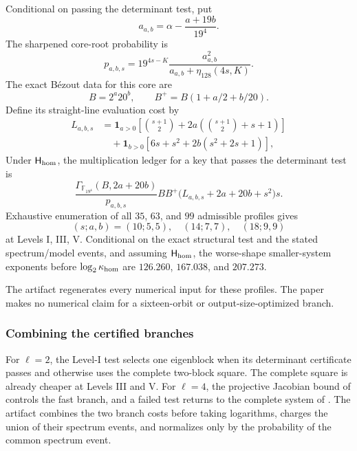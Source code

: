 \documentclass[11pt]{article}
\newcommand{\F}{\mathbb F}
\begin{document}
Conditional on passing the determinant test, put
\[
 a_{a,b}=\alpha-\frac{a+19b}{19^4}.
\]
The sharpened core-root probability is
\begin{equation}
 p_{a,b,s}
 =19^{4s-K}\frac{a_{a,b}^2}
                    {a_{a,b}+\eta_{128}(4s,K)}.       \label{eq:sq-l4-root}
\end{equation}
The exact B\'ezout data for this core are
\[
 B=2^a20^b,\qquad B^+=B(1+a/2+b/20).
\]
Define its straight-line evaluation cost by
\begin{align*}
 L_{a,b,s}
 &=\mathbf1_{a>0}\left[\binom{s+1}{2}
   +2a\left(\binom{s+1}{2}+s+1\right)\right]\\
 &\quad+\mathbf1_{b>0}\left[6s+s^2+2b(s^2+2s+1)\right],
\end{align*}
Under $\mathsf H_{\rm hom}$, the multiplication ledger for a key that passes
the determinant test is
\begin{equation}
 \frac{\Gamma_{\F_{19^4}}(B,2a+20b)}{p_{a,b,s}}
 BB^+\bigl(L_{a,b,s}+2a+20b+s^2\bigr)s.             \label{eq:sq-l4-fast-work}
\end{equation}
Exhaustive enumeration of all $35$, $63$, and $99$ admissible profiles gives
\[
 (s;a,b)=(10;5,5),\quad(14;7,7),\quad(18;9,9)
\]
at Levels I, III, V.  Conditional on the exact structural test and the
stated spectrum/model events, and assuming $\mathsf H_{\rm hom}$, the
worse-shape smaller-system exponents before $\log_2\kappa_{\rm hom}$ are
$126.260$, $167.038$, and $207.273$.

The artifact regenerates every numerical input for these profiles.  The paper
makes no numerical claim for a sixteen-orbit or output-size-optimized branch.

\subsubsection{Combining the certified branches}
\label{sec:sq-all-nine-details}

For $\ell=2$, the Level-I test selects one eigenblock when its determinant
certificate passes and otherwise uses the complete two-block square.  The
complete square is already cheaper at Levels III and V.  For $\ell=4$, the
projective Jacobian bound of  controls the
fast branch, and a failed test returns to the complete system of
.  The artifact combines the two branch costs
before taking logarithms, charges the union of their spectrum events, and
normalizes only by the probability of the common spectrum event.
\end{document}
